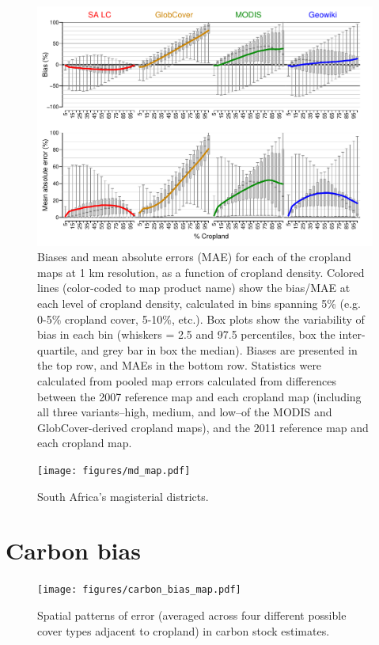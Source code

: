 \documentclass[11pt, titlepage]{article}
\begin{document}
\begin{figure}[ht]
  \centering
     \includegraphics[width = 12cm]{figures/biases_1km.pdf} 
      \caption{Biases and mean absolute errors (MAE) for each of the cropland maps at 1 km resolution, as a function of cropland density. Colored lines (color-coded to map product name) show the bias/MAE at each level of cropland density, calculated in bins spanning 5\% (e.g. 0-5\% cropland cover, 5-10\%, etc.). Box plots show the variability of bias in each bin (whiskers = 2.5 and 97.5 percentiles, box the inter-quartile, and grey bar in box the median). Biases are presented in the top row, and MAEs in the bottom row. Statistics were calculated from pooled map errors calculated from differences between the 2007 reference map and each cropland map (including all three variants--high, medium, and low--of the MODIS and GlobCover-derived cropland maps), and the 2011 reference map and each cropland map. }
      \label{fig:default}
\end{figure}

\begin{figure}[ht]
  \centering
     \texttt{[image: figures/md\_map.pdf]} 
      \caption{South Africa's magisterial districts.}
      \label{fig:default}
\end{figure}

\FloatBarrier
\section*{Carbon bias}
\begin{figure}[ht]
  \centering
     \texttt{[image: figures/carbon\_bias\_map.pdf]} 
      \caption{Spatial patterns of error (averaged across four different possible cover types adjacent to cropland) in carbon stock estimates. }
      \label{fig:default}
\end{figure}
\end{document}
